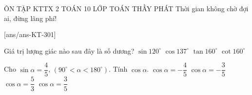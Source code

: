 \def\tenchude{ÔN TẬP KTTX 2}
\begin{name}
	{\tenchude}
	{TOÁN 10}
	{LỚP TOÁN THẦY PHÁT}
	{Thời gian không chờ đợi ai, đừng lãng phí!}
\end{name}

\setcounter{ex}{0}\setcounter{ex}{0}
[ans/ans-KT-301]

\begin{ex}
	Giá trị lượng giác nào sau đây là số dương?
	\choice
	{\True $\sin 120^\circ$}
	{$\cos 137^\circ$}
	{$\tan 160^\circ$}
	{$\cot 160^\circ$}
\end{ex}

\begin{ex}
	Cho $\sin\alpha=\dfrac{4}{5}$, $\left(90^\circ<\alpha <180^\circ\right)$. Tính $\cos\alpha $.
	\choice
	{$\cos\alpha=-\dfrac{4}{5}$}
	{\True $\cos\alpha=-\dfrac{3}{5}$}
	{$\cos\alpha=\dfrac{5}{3}$}
	{$\cos\alpha=\dfrac{3}{5}$}
\end{ex}


